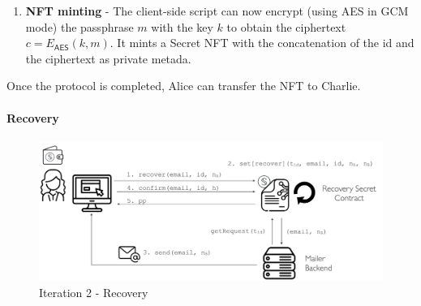 \documentclass[12pt]{article}
\newcommand{\ms}[1]{\ensuremath{\mathsf{#1}}}
\begin{document}
\begin{enumerate}
\item {\bf NFT minting} - The client-side script can now encrypt (using AES in GCM mode) the passphrase $m$ with the key $k$ to obtain the ciphertext $c=E_{\ms{AES}}(k, m)$. It mints a Secret NFT with the concatenation of the id and the ciphertext as private metada.  
\end{enumerate}

Once the protocol is completed, Alice can transfer the NFT to Charlie. 

\paragraph{Recovery}

\begin{figure}
  \includegraphics[width=\linewidth]{./media/media-004.png}
  \caption{Iteration 2 - Recovery}
  \label{it2:recovery}
\end{figure}
\end{document}
